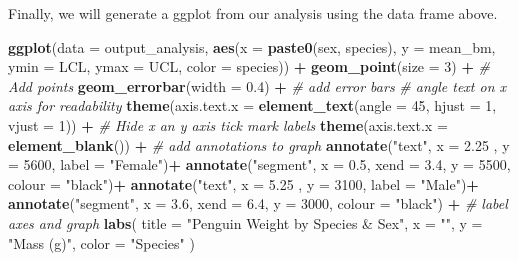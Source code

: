 \documentclass[
]{book}
\newenvironment{Shaded}{\begin{snugshade}}{\end{snugshade}}
\newcommand{\AttributeTok}[1]{\textcolor[rgb]{0.13,0.29,0.53}{#1}}
\newcommand{\CommentTok}[1]{\textcolor[rgb]{0.56,0.35,0.01}{\textit{#1}}}
\newcommand{\DecValTok}[1]{\textcolor[rgb]{0.00,0.00,0.81}{#1}}
\newcommand{\FloatTok}[1]{\textcolor[rgb]{0.00,0.00,0.81}{#1}}
\newcommand{\FunctionTok}[1]{\textcolor[rgb]{0.13,0.29,0.53}{\textbf{#1}}}
\newcommand{\NormalTok}[1]{#1}
\newcommand{\SpecialCharTok}[1]{\textcolor[rgb]{0.81,0.36,0.00}{\textbf{#1}}}
\newcommand{\StringTok}[1]{\textcolor[rgb]{0.31,0.60,0.02}{#1}}
\begin{document}
Finally, we will generate a ggplot from our analysis using the data frame above.

\begin{Shaded}
\begin{Highlighting}[]
\FunctionTok{ggplot}\NormalTok{(}\AttributeTok{data =}\NormalTok{ output\_analysis, }\FunctionTok{aes}\NormalTok{(}\AttributeTok{x =} \FunctionTok{paste0}\NormalTok{(sex, species), }\AttributeTok{y =}\NormalTok{ mean\_bm, }\AttributeTok{ymin =}\NormalTok{ LCL, }\AttributeTok{ymax =}\NormalTok{ UCL, }\AttributeTok{color =}\NormalTok{ species)) }\SpecialCharTok{+}
  \FunctionTok{geom\_point}\NormalTok{(}\AttributeTok{size =} \DecValTok{3}\NormalTok{) }\SpecialCharTok{+}  \CommentTok{\# Add points}
  \FunctionTok{geom\_errorbar}\NormalTok{(}\AttributeTok{width =} \FloatTok{0.4}\NormalTok{) }\SpecialCharTok{+} \CommentTok{\#  add error bars}
  \CommentTok{\# angle text on x axis for readability}
  \FunctionTok{theme}\NormalTok{(}\AttributeTok{axis.text.x =} \FunctionTok{element\_text}\NormalTok{(}\AttributeTok{angle =} \DecValTok{45}\NormalTok{, }\AttributeTok{hjust =} \DecValTok{1}\NormalTok{, }\AttributeTok{vjust =} \DecValTok{1}\NormalTok{)) }\SpecialCharTok{+}  
  \CommentTok{\# Hide x an y axis tick mark labels}
  \FunctionTok{theme}\NormalTok{(}\AttributeTok{axis.text.x =} \FunctionTok{element\_blank}\NormalTok{()) }\SpecialCharTok{+}
  \CommentTok{\# add annotations to graph}
  \FunctionTok{annotate}\NormalTok{(}\StringTok{"text"}\NormalTok{, }\AttributeTok{x =} \FloatTok{2.25}\NormalTok{ , }\AttributeTok{y =} \DecValTok{5600}\NormalTok{, }\AttributeTok{label =} \StringTok{"Female"}\NormalTok{)}\SpecialCharTok{+}  
  \FunctionTok{annotate}\NormalTok{(}\StringTok{"segment"}\NormalTok{, }\AttributeTok{x =} \FloatTok{0.5}\NormalTok{, }\AttributeTok{xend =} \FloatTok{3.4}\NormalTok{, }\AttributeTok{y =} \DecValTok{5500}\NormalTok{,  }\AttributeTok{colour =} \StringTok{"black"}\NormalTok{)}\SpecialCharTok{+}
  \FunctionTok{annotate}\NormalTok{(}\StringTok{"text"}\NormalTok{, }\AttributeTok{x =} \FloatTok{5.25}\NormalTok{ , }\AttributeTok{y =} \DecValTok{3100}\NormalTok{, }\AttributeTok{label =} \StringTok{"Male"}\NormalTok{)}\SpecialCharTok{+}  
  \FunctionTok{annotate}\NormalTok{(}\StringTok{"segment"}\NormalTok{, }\AttributeTok{x =} \FloatTok{3.6}\NormalTok{, }\AttributeTok{xend =} \FloatTok{6.4}\NormalTok{, }\AttributeTok{y =} \DecValTok{3000}\NormalTok{,  }\AttributeTok{colour =} \StringTok{"black"}\NormalTok{)  }\SpecialCharTok{+}
  \CommentTok{\# label axes and graph}
  \FunctionTok{labs}\NormalTok{(}
    \AttributeTok{title =} \StringTok{"Penguin Weight by Species \& Sex"}\NormalTok{,}
    \AttributeTok{x =} \StringTok{""}\NormalTok{,}
    \AttributeTok{y =} \StringTok{"Mass (g)"}\NormalTok{,}
    \AttributeTok{color =} \StringTok{"Species"}
\NormalTok{  ) }
\end{Highlighting}
\end{Shaded}
\end{document}
